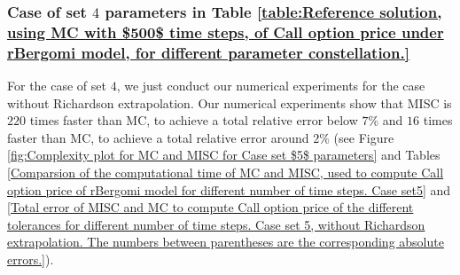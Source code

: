 \subsubsection{Case of set $4$ parameters in Table \ref{table:Reference solution, using MC with $500$ time steps, of Call option price under rBergomi model, for different parameter constellation.}}\label{sec:Case of set 5 parameters}

For the case of set $4$, we just conduct our numerical experiments for the case without Richardson extrapolation. Our numerical experiments show that  MISC is  $220$ times faster than MC, to achieve a total relative error below $7\%$ and $16$ times faster than MC, to achieve a total relative error around $2\%$  (see Figure \ref{fig:Complexity plot for MC and MISC for Case set $5$ parameters} and Tables \ref{Comparsion of the computational time of  MC and MISC, used to compute Call option price of rBergomi model for different number of time steps. Case set5} and \ref{Total error of MISC and MC to compute Call option price of the different tolerances for different number of time steps. Case set 5, without Richardson extrapolation. The numbers between parentheses are the corresponding absolute errors.}).

%		
%		

